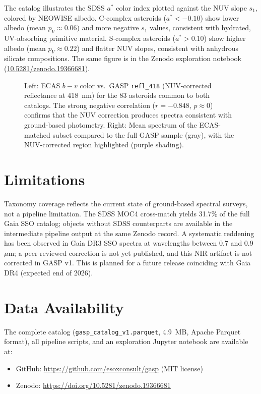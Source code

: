 \documentclass[modern]{aastex631}
\begin{document}
The catalog illustrates the SDSS $a^*$ color index
\citep[a C/S-complex separator;][]{Ivezic2002} plotted
against the NUV slope $s_1$, colored by NEOWISE albedo.
C-complex asteroids ($a^* < -0.10$) show lower albedo (mean $p_V \approx 0.06$) and more negative
$s_1$ values, consistent with hydrated, UV-absorbing
primitive material. S-complex asteroids ($a^* > 0.10$) show
higher albedo (mean $p_V \approx 0.22$) and flatter NUV
slopes, consistent with anhydrous silicate compositions.
The same figure is in the Zenodo exploration notebook
(\href{https://doi.org/10.5281/zenodo.19366681}
{10.5281/zenodo.19366681}).

\begin{figure}
\caption{Left: ECAS $b-v$ color vs.\ GASP \texttt{refl\_418}
(NUV-corrected reflectance at 418~nm) for the 83 asteroids
common to both catalogs. The strong negative correlation
($r = -0.848$, $p \approx 0$) confirms that the NUV correction
produces spectra consistent with ground-based photometry.
Right: Mean spectrum of the ECAS-matched subset compared to the
full GASP sample (gray), with the NUV-corrected region
highlighted (purple shading).\label{fig:ecas}}
\end{figure}

\section{Limitations}

Taxonomy coverage reflects the current state of ground-based
spectral surveys, not a pipeline limitation. The SDSS MOC4
cross-match yields 31.7\% of the full Gaia SSO catalog;
objects without SDSS counterparts are available in the
intermediate pipeline output at the same Zenodo record.
A systematic reddening has been observed in Gaia DR3 SSO
spectra at wavelengths between 0.7 and 0.9~$\mu$m; a
peer-reviewed correction is not yet published, and this
NIR artifact is not corrected in GASP v1. This is planned
for a future release coinciding with Gaia DR4
(expected end of 2026).

\section{Data Availability}

The complete catalog (\texttt{gasp\_catalog\_v1.parquet},
4.9~MB, Apache Parquet format), all pipeline scripts, and
an exploration Jupyter notebook are available at:

\begin{itemize}
\item GitHub: \url{https://github.com/esoxconsult/gasp}
      (MIT license)
\item Zenodo: \url{https://doi.org/10.5281/zenodo.19366681}
\end{itemize}
\end{document}
